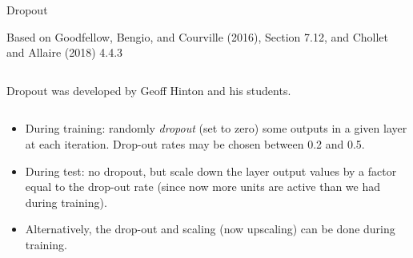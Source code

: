 \documentclass[10pt,ignorenonframetext,]{beamer}
\begin{document}
\begin{frame}

\begin{block}{Dropout}

\tiny

Based on Goodfellow, Bengio, and Courville (2016), Section 7.12, and
Chollet and Allaire (2018) 4.4.3

\normalsize

\(~\)

Dropout was developed by Geoff Hinton and his students.

\(~\)

\begin{itemize}
\item
  During training: randomly \emph{dropout} (set to zero) some outputs in
  a given layer at each iteration. Drop-out rates may be chosen between
  0.2 and 0.5. \vspace{1mm}
\item
  During test: no dropout, but scale down the layer output values by a
  factor equal to the drop-out rate (since now more units are active
  than we had during training). \vspace{1mm}
\item
  Alternatively, the drop-out and scaling (now upscaling) can be done
  during training. \vspace{1mm}
\end{itemize}

\end{block}

\end{frame}
\end{document}
